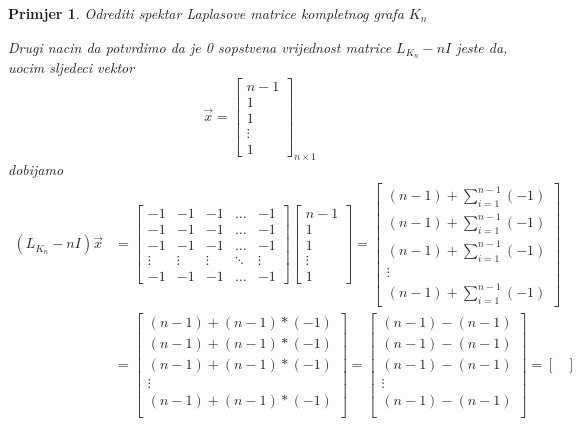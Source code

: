\documentclass[11pt]{article}
\newtheorem{example}{Primjer}
\begin{document}
\begin{example}{Odrediti spektar Laplasove matrice kompletnog grafa $K_n$}
	
	Drugi nacin da potvrdimo da je 0 sopstvena vrijednost matrice $L_{K_n} - n I$ jeste da, uocim sljedeci vektor
	\[
	\vec{x} =
	\begin{bmatrix}
	 n-1 \\ 
	1 \\
	1 \\
	\vdots \\
	1
	\end{bmatrix}_{n \times 1}
	\]
	dobijamo
	\[
	\begin{split}
	(L_{K_n} - nI) \vec{x} &= 
	\begin{bmatrix}
	-1 & -1 & -1 & \dots & -1 \\
	-1 & -1 & -1 & \dots & -1 \\
	-1 & -1 & -1 & \dots & -1 \\
	\vdots & \vdots & \vdots & \ddots & \vdots \\
	-1 & -1 & -1 & \dots & -1
	\end{bmatrix}
	\begin{bmatrix}
	n-1 \\
	1 \\
	1 \\
	\vdots \\
	1
	\end{bmatrix}
	 = 
	\begin{bmatrix}
	(n-1) + \sum_{i=1}^{n-1} (-1) \\
	(n-1) + \sum_{i=1}^{n-1} (-1) \\
	(n-1) + \sum_{i=1}^{n-1} (-1) \\
	\vdots \\
	(n-1) + \sum_{i=1}^{n-1} (-1)
	\end{bmatrix}  \\
	& =
	\begin{bmatrix}
	(n-1) + (n-1) * (-1) \\
	(n-1) + (n-1) * (-1) \\
	(n-1) + (n-1) * (-1) \\
	\vdots \\
	(n-1) + (n-1) * (-1) \\
	\end{bmatrix}
	=
	\begin{bmatrix}
	(n-1) - (n-1) \\
	(n-1) - (n-1) \\
	(n-1) - (n-1) \\
	\vdots \\
	(n-1) - (n-1) \\
	\end{bmatrix}
	 =
	\begin{bmatrix}

\end{bmatrix}
\end{split}\]
\end{example}
\end{document}
